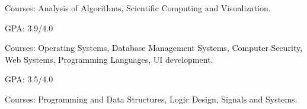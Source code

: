 
\USC
{}
\begin{miniItemize}
    \item Courses:
        Analysis of Algorithms,
        Scientific Computing and Visualization.
\end{miniItemize}

\UM
{}
\begin{miniItemize}
    \item GPA: 3.9/4.0
    \item Courses:
        Operating Systems,
        Database Management Systems,
        Computer Security,
        Web Systems,
        Programming Languages,
        UI development.
\end{miniItemize}

\SJTU
{}
\begin{miniItemize}
    \item GPA: 3.5/4.0
    \item Courses:
        Programming and Data Structures,
        Logic Design,
        Signals and Systems.
\end{miniItemize}
